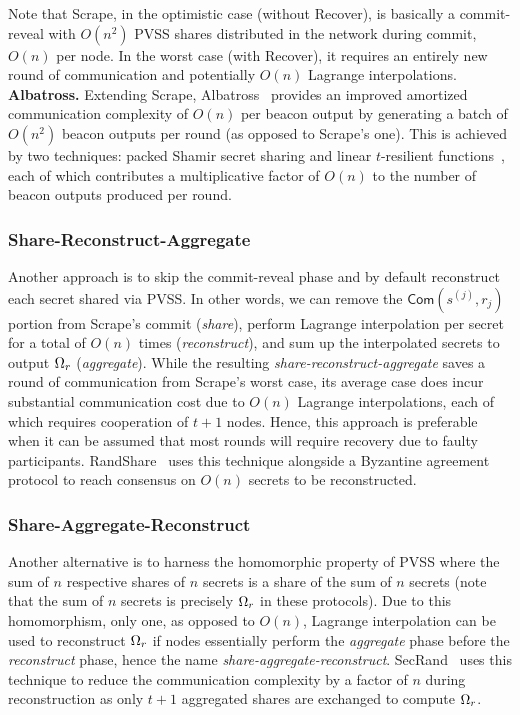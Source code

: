 Note that Scrape, in the optimistic case (without Recover), is basically a commit-reveal with $O(n^2)$ PVSS shares distributed in the network during commit, $O(n)$ per node. In the worst case (with Recover), it requires an entirely new round of communication and potentially $O(n)$ Lagrange interpolations.\\

\noindent\textbf{Albatross.} Extending Scrape, Albatross~\cite{cascudo2020albatross} provides an improved amortized communication complexity of $O(n)$ per beacon output by generating a batch of $O(n^2)$ beacon outputs per round (as opposed to Scrape's one). This is achieved by two techniques: packed Shamir secret sharing and linear $t$-resilient functions~\cite{cascudo2020albatross}, each of which contributes a multiplicative factor of $O(n)$ to the number of beacon outputs produced per round.

\subsubsection{Share-Reconstruct-Aggregate}
Another approach is to skip the commit-reveal phase and by default reconstruct each secret shared via PVSS. In other words, we can remove the $\mathsf{Com}(s^{(j)}, r_j)$ portion from Scrape's commit (\textit{share}), perform Lagrange interpolation per secret for a total of $O(n)$ times (\textit{reconstruct}), and sum up the interpolated secrets to output $\Omega_r$ (\textit{aggregate}). While the resulting \textit{share-reconstruct-aggregate} saves a round of communication from Scrape's worst case, its average case does incur substantial communication cost due to $O(n)$ Lagrange interpolations, each of which requires cooperation of $t + 1$ nodes. Hence, this approach is preferable when it can be assumed that most rounds will require recovery due to faulty participants. RandShare~\cite{syta2017scalable} uses this technique alongside a Byzantine agreement protocol to reach consensus on $O(n)$ secrets to be reconstructed.

\subsubsection{Share-Aggregate-Reconstruct}
Another alternative is to harness the homomorphic property of PVSS where the sum of $n$ respective shares of $n$ secrets is a share of the sum of $n$ secrets (note that the sum of $n$ secrets is precisely $\Omega_r$ in these protocols). Due to this homomorphism, only one, as opposed to $O(n)$, Lagrange interpolation can be used to reconstruct $\Omega_r$ if nodes essentially perform the \textit{aggregate} phase before the \textit{reconstruct} phase, hence the name \textit{share-aggregate-reconstruct}. SecRand~\cite{guo2020secRand} uses this technique to reduce the communication complexity by a factor of $n$ during reconstruction as only $t + 1$ aggregated shares are exchanged to compute $\Omega_r$.

